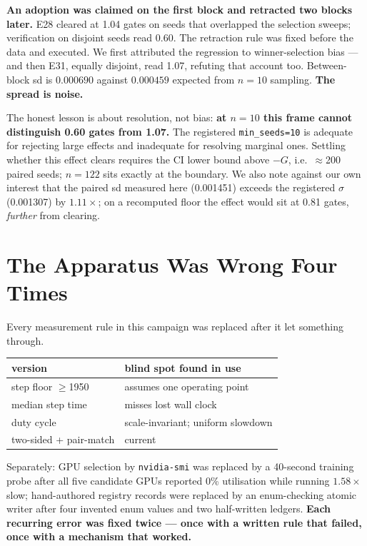 \documentclass{article}
\begin{document}
\textbf{An adoption was claimed on the first block and retracted two blocks later.} E28 cleared at 1.04 gates on seeds that overlapped the selection sweeps; verification on disjoint seeds read 0.60. The retraction rule was fixed before the data and executed. We first attributed the regression to winner-selection bias --- and then E31, equally disjoint, read 1.07, refuting that account too. Between-block sd is $0.000690$ against $0.000459$ expected from $n{=}10$ sampling. \textbf{The spread is noise.}

The honest lesson is about resolution, not bias: \textbf{at $n{=}10$ this frame cannot distinguish 0.60 gates from 1.07.} The registered \texttt{min\_seeds=10} is adequate for rejecting large effects and inadequate for resolving marginal ones. Settling whether this effect clears requires the CI lower bound above $-G$, i.e.\ $\approx$200 paired seeds; $n{=}122$ sits exactly at the boundary. We also note against our own interest that the paired sd measured here (0.001451) exceeds the registered $\sigma$ (0.001307) by $1.11\times$; on a recomputed floor the effect would sit at 0.81 gates, \emph{further} from clearing.

\section{The Apparatus Was Wrong Four Times}
Every measurement rule in this campaign was replaced after it let something through.

\begin{center}\begin{small}
\begin{tabular}{ll}
\toprule
version & blind spot found in use \\
\midrule
step floor $\ge$1950 & assumes one operating point \\
median step time & misses lost wall clock \\
duty cycle & scale-invariant; uniform slowdown \\
two-sided + pair-match & current \\
\bottomrule
\end{tabular}
\end{small}\end{center}

Separately: GPU selection by \texttt{nvidia-smi} was replaced by a 40-second training probe after all five candidate GPUs reported 0\% utilisation while running $1.58\times$ slow; hand-authored registry records were replaced by an enum-checking atomic writer after four invented enum values and two half-written ledgers. \textbf{Each recurring error was fixed twice --- once with a written rule that failed, once with a mechanism that worked.}
\end{document}
